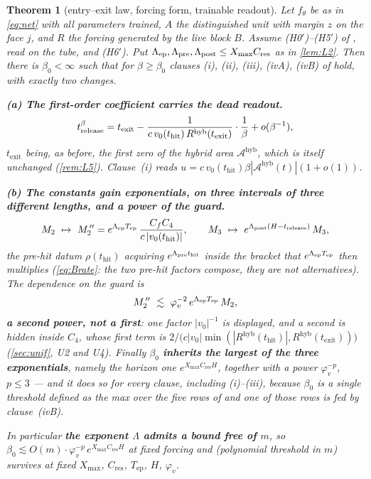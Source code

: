 \documentclass[11pt]{article}
\newtheorem{theorem}{Theorem}
\theoremstyle{remark}
\newcommand{\thit}{t_{\mathrm{hit}}}
\newcommand{\texit}{t_{\mathrm{exit}}}
\newcommand{\trel}{t_{\mathrm{release}}}
\newcommand{\Ar}{\mathcal{A}}
\newcommand{\Tep}{T_{\mathrm{ep}}}
\newcommand{\hyb}{\mathrm{hyb}}
\newcommand{\Cres}{C_{\mathrm{res}}}
\newcommand{\Xmax}{X_{\max}}
\newcommand{\hyplabel}[1]{\textup{(#1)}}
\begin{document}
\begin{theorem}[entry--exit law, forcing form, trainable readout]\label{thm:d2}
Let $f_\theta$ be as in \eqref{eq:net} with \emph{all} parameters trained,
$A$ the distinguished unit with margin $z$ on the face $j$, and $R$ the forcing
\cite[(2)]{paper} generated by the live block $B$. Assume
\hyplabel{H0$'$}--\hyplabel{H5$'$} of \cite[\S3.1]{paper}, read on the tube, and
\hyplabel{H6$'$}. Put $\Lambda_{\rm ep},\Lambda_{\rm pre},\Lambda_{\rm post}
\le\Xmax\Cres$ as in \cref{lem:L2}. Then there is $\beta_0<\infty$ such that for
$\beta\ge\beta_0$ clauses \textup{(i)}, \textup{(ii)}, \textup{(iii)},
\textup{(ivA)}, \textup{(ivB)} of \cite[Thm.~6]{paper} hold, with exactly two
changes.

\smallskip\noindent
\textbf{(a) The first-order coefficient carries the dead readout.}
\begin{equation}\label{eq:release}
t^\beta_{\rm release}
=\texit-\frac{1}{c\,v_0(\thit)\,R^{\hyb}(\texit)}\cdot\frac1\beta+o(\beta^{-1}),
\end{equation}
$\texit$ being, as before, the first zero of the hybrid area $\Ar^{\hyb}$, which
is itself unchanged (\cref{rem:L5}). Clause~(i) reads
$u=c\,v_0(\thit)\beta|\Ar^{\hyb}(t)|(1+o(1))$.

\smallskip\noindent
\textbf{(b) The constants gain exponentials, on three intervals of three
different lengths, and a power of the guard.}
\[
M_2\ \mapsto\ M_2^{\,\prime\prime}=e^{\Lambda_{\rm ep}\Tep}\,\frac{C_fC_4}{c\,|v_0(\thit)|},
\qquad
M_3\ \mapsto\ e^{\Lambda_{\rm post}(H-\trel)}\,M_3 ,
\]
the pre-hit datum $\rho(\thit)$ acquiring $e^{\Lambda_{\rm pre}\thit}$
\emph{inside} the bracket that $e^{\Lambda_{\rm ep}\Tep}$ then multiplies
(\cref{eq:Brate}: the two pre-hit factors \emph{compose}, they are not
alternatives). The dependence on the guard is
\[
M_2^{\,\prime\prime}\ \lesssim\ \varphi_v^{-2}\,e^{\Lambda_{\rm ep}\Tep}\,M_2 ,
\]
\textbf{a second power, not a first}: one factor $|v_0|^{-1}$ is displayed, and
a second is hidden inside $C_4$, whose first term is
$2/\bigl(c|v_0|\min(|R^{\hyb}(\thit)|,R^{\hyb}(\texit))\bigr)$ (\cref{sec:unif},
U2 and U4). Finally $\beta_0$ \textbf{inherits the largest of the three
exponentials}, namely the horizon one $e^{\Xmax\Cres H}$, together with a power
$\varphi_v^{-p}$, $p\le3$ --- and it does so \emph{for every clause}, including
(i)--(iii), because $\beta_0$ is a single threshold defined as the max over the
five rows of \cite[Tab.~5]{paper} and one of those rows is fed by
clause~(ivB).

\smallskip
In particular \textbf{the exponent $\Lambda$ admits a bound free of $m$}, so
$\beta_0\lesssim O(m)\cdot\varphi_v^{-p}\,e^{\Xmax\Cres H}$ at fixed forcing and
\cite[Prop.~7]{paper} (polynomial threshold in $m$) survives at fixed
$\Xmax$, $\Cres$, $\Tep$, $H$, $\varphi_v$.
\end{theorem}
\end{document}
